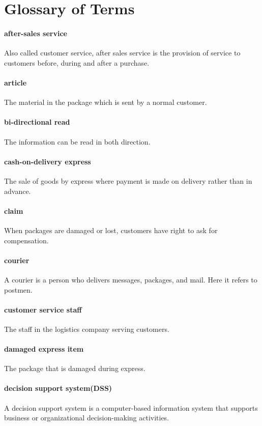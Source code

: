 \documentclass[12pt]{scrreprt}
\begin{document}
\chapter{Glossary of Terms}
\begin{spacing}{0.7}
\subsubsection{after-sales service}
Also called customer service, after sales service is the provision of
service to customers before, during and after a purchase.
\subsubsection{article}
The material in the package which is sent by a normal customer.
\subsubsection{bi-directional read}
The information can be read in both direction.
\subsubsection{cash-on-delivery express}
The sale of goods by express where payment is made on delivery rather
than in advance.
\subsubsection{claim}
When packages are damaged or lost, customers have right to ask for compensation.
\subsubsection{courier}
A courier is a person who delivers messages, packages, and mail. Here it refers
to postmen.
\subsubsection{customer service staff}
The staff in the logistics company serving customers.
\subsubsection{damaged express item}
The package that is damaged during express.
\subsubsection{decision support system(DSS)}
A decision support system is a computer-based information system that supports
 business or organizational decision-making activities.

\end{spacing}
\end{document}
